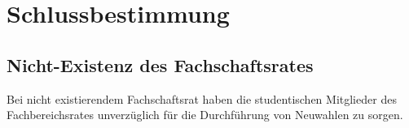 \section{Schlussbestimmung}
\subsection{Nicht-Existenz des Fachschaftsrates}
Bei nicht existierendem Fachschaftsrat haben die studentischen Mitglieder des Fachbereichsrates unverzüglich für die Durchführung von Neuwahlen zu sorgen.
